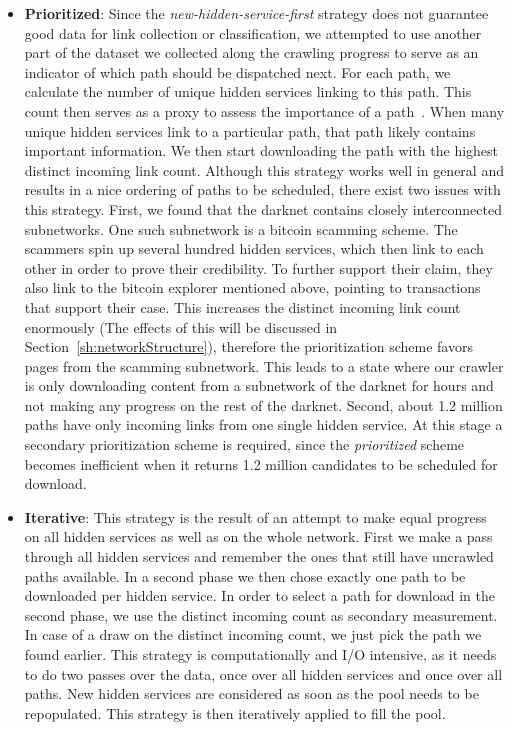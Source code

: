\begin{itemize}
  \item \textbf{Prioritized}: Since the \emph{new-hidden-service-first} strategy does not guarantee good data for link collection or classification, we attempted to use another part of the dataset we collected along the crawling progress to serve as an indicator of which path should be dispatched next. For each path, we calculate the number of unique hidden services linking to this path. This count then serves as a proxy to assess the importance of a path~\cite{PageRank}. When many unique hidden services link to a particular path, that path likely contains important information. We then start downloading the path with the highest distinct incoming link count. Although this strategy works well in general and results in a nice ordering of paths to be scheduled, there exist two issues with this strategy. First, we found that the darknet contains closely interconnected subnetworks. One such subnetwork is a bitcoin scamming scheme. The scammers spin up several hundred hidden services, which then link to each other in order to prove their credibility. To further support their claim, they also link to the bitcoin explorer mentioned above, pointing to transactions that support their case. This increases the distinct incoming link count enormously (The effects of this will be discussed in Section~\ref{sh:networkStructure}), therefore the prioritization scheme favors pages from the scamming subnetwork. This leads to a state where our crawler is only downloading content from a subnetwork of the darknet for hours and not making any progress on the rest of the darknet. Second, about 1.2 million paths have only incoming links from one single hidden service. At this stage a secondary prioritization scheme is required, since the \emph{prioritized} scheme becomes inefficient when it returns 1.2 million candidates to be scheduled for download.
  \item \textbf{Iterative}: This strategy is the result of an attempt to make equal progress on all hidden services as well as on the whole network.  First we make a pass through all hidden services and remember the ones that still have uncrawled paths available. In a second phase we then chose exactly one path to be downloaded per hidden service. In order to select a path for download in the second phase, we use the distinct incoming count as secondary measurement. In case of a draw on the distinct incoming count, we just pick the path we found earlier. This strategy is computationally and I/O intensive, as it needs to do two passes over the data, once over all hidden services and once over all paths. New hidden services are considered as soon as the pool needs to be repopulated. This strategy is then iteratively applied to fill the pool.

\end{itemize}

